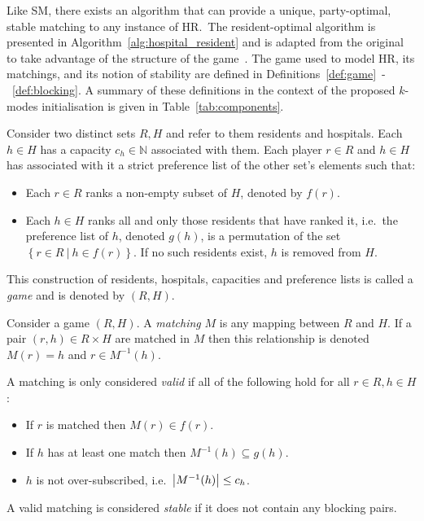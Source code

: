 Like SM, there exists an algorithm that can provide a unique, party-optimal,
stable matching to any instance of HR.\ The resident-optimal algorithm is
presented in Algorithm~\ref{alg:hospital_resident} and is adapted from the
original to take advantage of the structure of the game~\cite{Roth1984}. The
game used to model HR, its matchings, and its notion of stability are defined in
Definitions~\ref{def:game}~\--~\ref{def:blocking}. A summary of these
definitions in the context of the proposed \(k\)-modes initialisation is given
in Table~\ref{tab:components}.

\begin{definition}\label{def:game}
    Consider two distinct sets \(R, H\) and refer to them residents and
    hospitals. Each \(h \in H\) has a capacity \(c_h \in \mathbb{N}\) associated
    with them. Each player \(r \in R\) and \(h \in H\) has associated 
    with it a strict preference list of the other set's elements such that:
    \begin{itemize}
        \item Each \(r \in R\) ranks a non-empty subset of \(H\), denoted by
            \(f(r)\).
        \item Each \(h \in H\) ranks all and only those residents that have
            ranked it, i.e.\ the preference list of \(h\), denoted \(g(h)\), is
            a permutation of the set
            \(\left\{r \in R \ | \ h \in f(r)\right\}\). If no such residents
            exist, \(h\) is removed from \(H\).
    \end{itemize}

    This construction of residents, hospitals, capacities and preference lists
    is called a \emph{game} and is denoted by \((R, H)\).
\end{definition}

\begin{definition}\label{def:matching}
    Consider a game \((R, H)\). A \emph{matching} \(M\) is any mapping between
    \(R\) and \(H\). If a pair \((r, h) \in R \times H\) are matched in \(M\)
    then this relationship is denoted \(M(r) = h\) and \(r \in M^{-1}(h)\).

    A matching is only considered \emph{valid} if all of the following hold for
    all \(r \in R, h \in H\):
    \begin{itemize}
        \item If \(r\) is matched then \(M(r) \in f(r)\).
        \item If \(h\) has at least one match then \(M^{-1}(h) \subseteq g(h)\).
        \item \(h\) is not over-subscribed, i.e.\ \(\abs*{M^{-1}(h)} \leq c_h\).
    \end{itemize}

    A valid matching is considered \emph{stable} if it does not contain any
    blocking pairs.
\end{definition}

